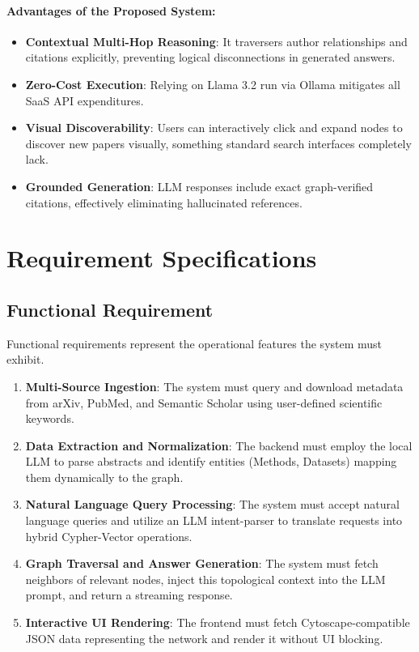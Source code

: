 \documentclass[12pt,a4paper]{report}
\begin{document}
\paragraph{Advantages of the Proposed System:}
\begin{itemize}
    \item \textbf{Contextual Multi-Hop Reasoning}: It traversers author relationships and citations explicitly, preventing logical disconnections in generated answers.
    \item \textbf{Zero-Cost Execution}: Relying on Llama 3.2 run via Ollama mitigates all SaaS API expenditures.
    \item \textbf{Visual Discoverability}: Users can interactively click and expand nodes to discover new papers visually, something standard search interfaces completely lack.
    \item \textbf{Grounded Generation}: LLM responses include exact graph-verified citations, effectively eliminating hallucinated references.
\end{itemize}

\section{Requirement Specifications}

\subsection{Functional Requirement}
Functional requirements represent the operational features the system must exhibit.
\begin{enumerate}
    \item \textbf{Multi-Source Ingestion}: The system must query and download metadata from arXiv, PubMed, and Semantic Scholar using user-defined scientific keywords.
    \item \textbf{Data Extraction and Normalization}: The backend must employ the local LLM to parse abstracts and identify entities (Methods, Datasets) mapping them dynamically to the graph.
    \item \textbf{Natural Language Query Processing}: The system must accept natural language queries and utilize an LLM intent-parser to translate requests into hybrid Cypher-Vector operations.
    \item \textbf{Graph Traversal and Answer Generation}: The system must fetch neighbors of relevant nodes, inject this topological context into the LLM prompt, and return a streaming response.
    \item \textbf{Interactive UI Rendering}: The frontend must fetch Cytoscape-compatible JSON data representing the network and render it without UI blocking.
\end{enumerate}
\end{document}
